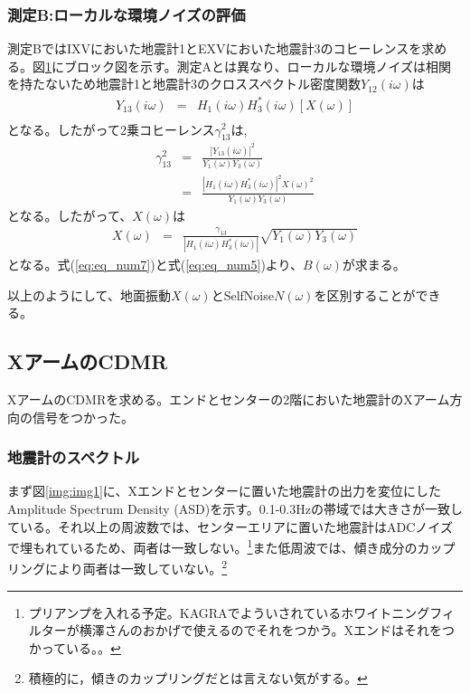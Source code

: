 \subsubsection{測定B:ローカルな環境ノイズの評価}
\begin{figure}[H]
  \begin{center}
  \end{center}
  \caption{
  }\label{img:img_testB}
\end{figure}

測定BではIXVにおいた地震計1とEXVにおいた地震計3のコヒーレンスを求める。図\ref{img:img_testB}にブロック図を示す。測定Aとは異なり、ローカルな環境ノイズは相関を持たないため地震計1と地震計3のクロススペクトル密度関数$Y_{12}(i\omega)$は
\begin{eqnarray}
Y_{13}(i\omega) &=& H_{1}(i\omega)H_{3}^{*}(i\omega)\left[X(\omega) \right] \\ 
\end{eqnarray}
となる。したがって2乗コヒーレンス$\gamma_{13}^{2}$は,
\begin{eqnarray}
  \gamma_{13}^{2} &=& \frac{\left| Y_{13}(i\omega)\right|^{2}}{Y_1(\omega)Y_3({\omega})}\\
  &=& \frac{\left | H_{1}(i\omega)H_{3}^{*}(i\omega)\right|^{2}X(\omega)^{2}}{Y_1(\omega)Y_3({\omega})}\label{eq:eq_num6}
\end{eqnarray}
となる。したがって、$X(\omega)$は
\begin{eqnarray}
  X(\omega) &=& \frac{\gamma_{13}}{\left | H_{1}(i\omega)H_{3}^{*}(i\omega)\right|}
  \sqrt{Y_1(\omega)Y_3({\omega})} \label{eq:eq_num7}
\end{eqnarray}
となる。式(\ref{eq:eq_num7})と式(\ref{eq:eq_num5})より、$B(\omega)$が求まる。


以上のようにして、地面振動$X(\omega)$とSelfNoise$N(\omega)$を区別することができる。


\subsection{XアームのCDMR}
XアームのCDMRを求める。エンドとセンターの2階においた地震計のXアーム方向の信号をつかった。

\subsubsection{地震計のスペクトル}
まず図\ref{img:img1}に、Xエンドとセンターに置いた地震計の出力を変位にしたAmplitude Spectrum Density (ASD)を示す。0.1-0.3Hzの帯域では大きさが一致している。それ以上の周波数では、センターエリアに置いた地震計はADCノイズで埋もれているため、両者は一致しない。\footnote[6]{プリアンプを入れる予定。KAGRAでよういされているホワイトニングフィルターが横澤さんのおかげで使えるのでそれをつかう。Xエンドはそれをつかっている。。}また低周波では、傾き成分のカップリングにより両者は一致していない。\footnote[7]{積極的に，傾きのカップリングだとは言えない気がする。}


